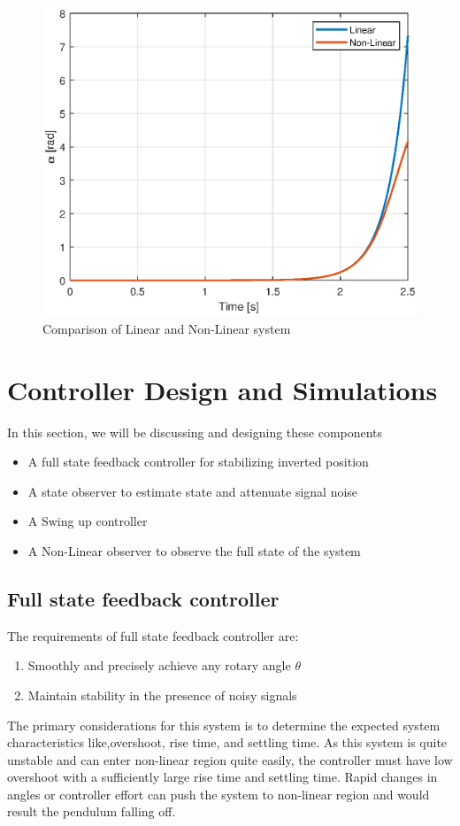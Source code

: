 \documentclass[superscriptaddress,floatfix,reprint,amssymb, amsmath,aps, pre]{revtex4-1}
\begin{document}
{{        \begin{figure}[h!]
            \includegraphics[width = \linewidth]{LinearNonLinear.eps}
            \caption{Comparison of Linear and Non-Linear system}
            \label{fig:LinearNonLinear}
        \end{figure}
    }
    \section{Controller Design and Simulations}
    {
        In this section, we will be discussing and designing these components
        \begin{itemize}
            \item A full state feedback controller for stabilizing inverted position 
            \item A state observer to estimate state and attenuate signal noise
            \item A Swing up controller 
            \item A Non-Linear observer to observe the full state of the system
        \end{itemize}
        \subsection{Full state feedback controller}{
            The requirements of full state feedback controller are:
            \begin{enumerate}
                \item Smoothly and precisely achieve any rotary angle \(\theta\)
                \item Maintain stability in the presence of noisy signals
            \end{enumerate}
            The primary considerations for this system is to determine the expected system characteristics like,overshoot, rise time, and settling time. As this system is quite unstable and can enter non-linear region quite easily, the controller must have low overshoot with a sufficiently large rise time and settling time. Rapid changes in angles or controller effort can push the system to non-linear region and would result the pendulum falling off. 

}}}
\end{document}

